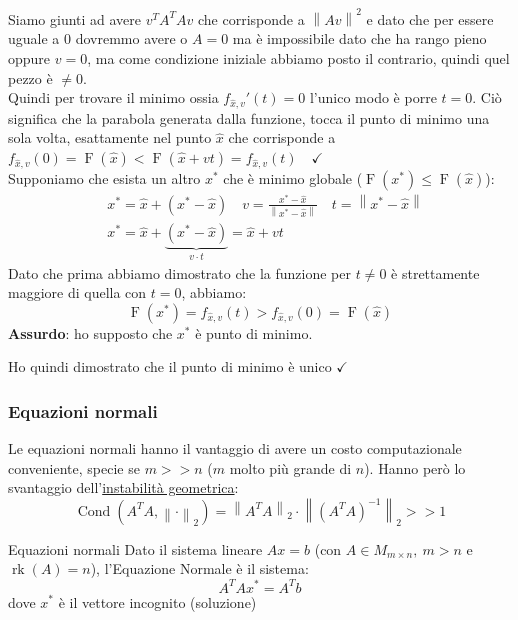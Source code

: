 \documentclass{article}
\begin{document}
Siamo giunti ad avere $v^TA^TAv$ che corrisponde a $\left\|Av\right\|^2$ e dato che per essere uguale a $0$ dovremmo avere o $A=0$ ma è impossibile dato che ha rango pieno oppure $v=0$, ma come condizione
iniziale abbiamo posto il contrario, quindi quel pezzo è $\ne0$.\\
Quindi per trovare il minimo ossia $f_{\widehat{x},v}'(t)=0$ l'unico modo è porre $t=0$. Ciò significa che la parabola generata dalla funzione,
tocca il punto di minimo una sola volta, esattamente nel punto $\widehat{x}$ che corrisponde a $f_{\widehat{x},v}(0)=\operatorname{F}(\widehat{x})<\operatorname{F}(\widehat{x}+vt)=f_{\widehat{x},v}(t)\quad\checkmark$\\

Supponiamo che esista un altro $x^\ast$ che è minimo globale ($\operatorname{F}(x^\ast)\le\operatorname{F}(\widehat{x})$):
\begin{align*}
     & x^* = \widehat{x} + (x^* - \widehat{x})\quad v=\frac{x^\ast-\widehat{x}}{\left\|x^\ast-\widehat{x}\right\|}\quad t=\left\|x^\ast-\widehat{x}\right\| \\
     & x^*=\widehat{x}+\underbrace{(x^* - \widehat{x})}_{v\cdot t}=\widehat{x}+vt
\end{align*}
Dato che prima abbiamo dimostrato che la funzione per $t\ne0$ è strettamente maggiore di quella con $t=0$,  abbiamo:
\[\operatorname{F}(x^*)=f_{\widehat{x},v}(t)>f_{\widehat{x},v}(0)=\operatorname{F}(\widehat{x})\]
\textbf{Assurdo}: ho supposto che $x^*$ è punto di minimo.

Ho quindi dimostrato che il punto di minimo è unico $\checkmark$

\subsubsection{Equazioni normali}
Le equazioni normali hanno il vantaggio di avere un costo computazionale conveniente, specie se $m>>n$ ($m$ molto più grande di $n$).
Hanno però lo svantaggio dell'\underline{instabilità geometrica}:
\[\operatorname{Cond}\left(A^TA,\left\|\cdot\right\|_2\right)=\left\|A^TA\right\|_2\cdot\left\|\left(A^TA\right)^{-1}\right\|_2>>1\]

\begin{defi}{Equazioni normali}{}
    Dato il sistema lineare $Ax=b$ (con $A\in M_{m\times n},\ m>n $ e $\operatorname{rk}(A)=n$), l'Equazione Normale è il sistema:
    \[A^TAx^\ast=A^Tb\]
    dove $x^*$ è il vettore incognito (soluzione)
\end{defi}
\end{document}
